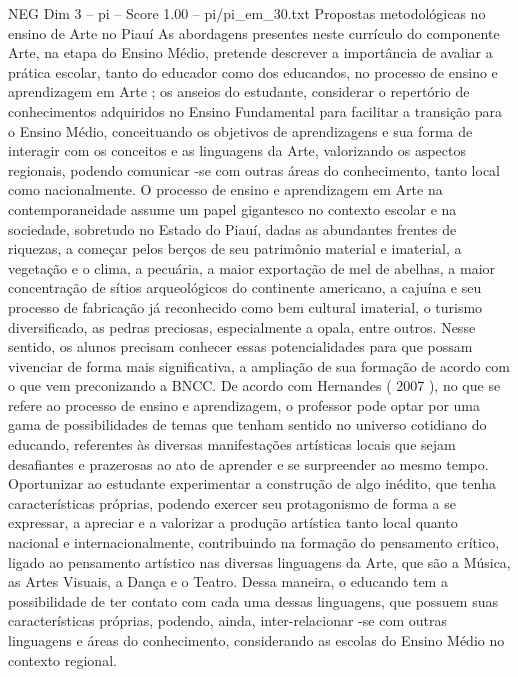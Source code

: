 \begin{textsample}{NEG Dim 3 – pi – Score 1.00 – pi/pi\_em\_30.txt}  \label{ex:f3_neg_034}
Propostas metodológicas no ensino de Arte no Piauí As abordagens presentes neste currículo do componente Arte, na etapa do Ensino Médio, pretende descrever a importância de avaliar a prática escolar, tanto do educador como dos educandos, no processo de ensino e aprendizagem em Arte ; os anseios do estudante, considerar o repertório de conhecimentos adquiridos no Ensino Fundamental para facilitar a transição para o Ensino Médio, conceituando os objetivos de aprendizagens e sua forma de interagir com os conceitos e as linguagens da Arte, valorizando os aspectos regionais, podendo comunicar -se com outras áreas do conhecimento, tanto local como nacionalmente.
O processo de ensino e aprendizagem em Arte na contemporaneidade assume um papel gigantesco no contexto escolar e na sociedade, sobretudo no Estado do Piauí, dadas as abundantes frentes de riquezas, a começar pelos berços de seu patrimônio material e imaterial, a vegetação e o clima, a pecuária, a maior exportação de mel de abelhas, a maior concentração de sítios arqueológicos do continente americano, a cajuína e seu processo de fabricação já reconhecido como bem cultural imaterial, o turismo diversificado, as pedras preciosas, especialmente a opala, entre outros.
Nesse sentido, os alunos precisam conhecer essas potencialidades para que possam vivenciar de forma mais significativa, a ampliação de sua formação de acordo com o que vem preconizando a BNCC.
De acordo com Hernandes ( 2007 ), no que se refere ao processo de ensino e aprendizagem, o professor pode optar por uma gama de possibilidades de temas que tenham sentido no universo cotidiano do educando, referentes às diversas manifestações artísticas locais que sejam desafiantes e prazerosas ao ato de aprender e se surpreender ao mesmo tempo.
Oportunizar ao estudante experimentar a construção de algo inédito, que tenha características próprias, podendo exercer seu protagonismo de forma a se expressar, a apreciar e a valorizar a produção artística tanto local quanto nacional e internacionalmente, contribuindo na formação do pensamento crítico, ligado ao pensamento artístico nas diversas linguagens da Arte, que são a Música, as Artes Visuais, a Dança e o Teatro.
Dessa maneira, o educando tem a possibilidade de ter contato com cada uma dessas linguagens, que possuem suas características próprias, podendo, ainda, inter-relacionar -se com outras linguagens e áreas do conhecimento, considerando as escolas do Ensino Médio no contexto regional.

\end{textsample}
